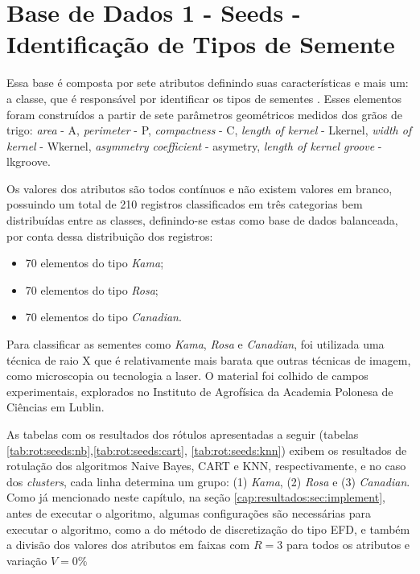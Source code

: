 

\section{Base de Dados 1 - Seeds - Identificação de Tipos de Semente}
Essa base é composta por sete  atributos definindo suas características e mais um: a  classe, que é responsável por identificar os tipos de sementes \cite{Charytanowicz2010}. Esses elementos foram construídos a partir de sete parâmetros geométricos medidos dos grãos de trigo: \textit{area} - A, \textit{perimeter} - P, \textit{compactness} - C, \textit{length of kernel} - Lkernel, \textit{width of kernel} - Wkernel, \textit{asymmetry coefficient} - asymetry, \textit{length of kernel groove} - lkgroove.

Os valores dos atributos são todos contínuos e não existem valores em branco, possuindo um total de 210 registros classificados em três categorias bem distribuídas entre as classes, definindo-se estas como base de dados balanceada, por conta dessa distribuição dos registros: 
\begin{itemize}[noitemsep]
 \item 70 elementos do tipo \textit{Kama};
 \item 70 elementos do tipo \textit{Rosa};
 \item 70 elementos do tipo \textit{Canadian}.
\end{itemize}

Para classificar as sementes como \textit{Kama}, \textit{Rosa} e \textit{Canadian}, foi utilizada uma técnica de raio X que é relativamente mais barata que outras técnicas de imagem, como microscopia ou tecnologia a laser. O material foi colhido de campos experimentais, explorados no Instituto de Agrofísica da Academia Polonesa de Ciências em Lublin.

As tabelas com os resultados dos rótulos apresentadas a seguir (tabelas \ref{tab:rot:seeds:nb},\ref{tab:rot:seeds:cart}, \ref{tab:rot:seeds:knn}) exibem os resultados de rotulação dos algoritmos Naive Bayes, CART e KNN, respectivamente, e no caso dos \textit{clusters}, cada linha determina um grupo: (1) \textit{Kama}, (2) \textit{Rosa} e (3) \textit{Canadian}. Como já mencionado neste capítulo, na seção \ref{cap:resultados:sec:implement}, antes de executar o algoritmo, algumas configurações são necessárias para executar o algoritmo, como a do método de discretização do tipo EFD, e também a divisão dos valores dos atributos em faixas com ${R=3}$ para todos os atributos e variação ${V=0\%}$ 

